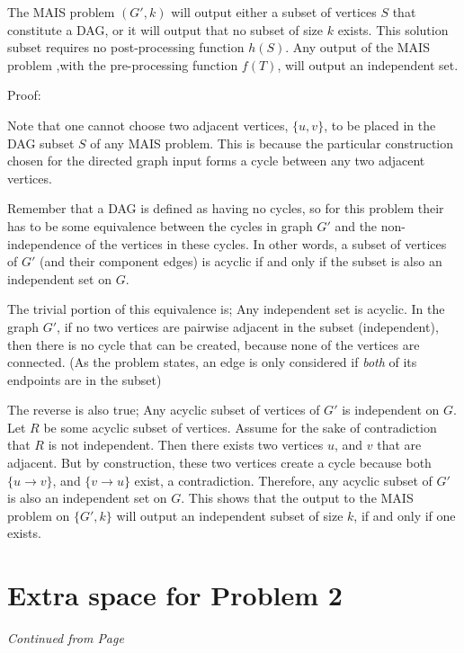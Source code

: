 \documentclass[11pt]{article}
\begin{document}
\label{pg:p1-continuation}

  The MAIS problem $(G',k)$ will output either a subset of vertices $S$ that constitute
  a DAG, or it will output that no subset of size $k$ exists. This solution subset
  requires no post-processing function $h(S)$. Any output of the MAIS problem 
  ,with the pre-processing function $f(T)$, will output an independent set. 
  
  Proof: 

  Note that one cannot choose two adjacent vertices, $\{u,v\}$,
  to be placed in the DAG subset $S$ of any MAIS problem. 
  This is because the particular
  construction chosen for the directed graph input forms a cycle between any two
  adjacent vertices. 

  Remember that a DAG is defined as having no cycles, so for this problem
  their has to be some equivalence between the cycles in graph $G'$ and 
  the non-independence of the vertices in these cycles. In other words, 
  a subset of vertices of $G'$ (and their component edges) is acyclic if and only if the subset
  is also an independent set on $G$. 
  
  The trivial portion of this equivalence is; Any independent set is acyclic. 
  In the graph $G'$, if no two vertices are pairwise adjacent in the subset (independent),
  then there is no cycle that can be created, because none of the vertices are connected. 
  (As the problem states, an edge is only considered if \emph{both} of its endpoints are in the subset)
  
  The reverse is also true; Any acyclic subset of vertices of $G'$ is independent on $G$.
  Let $R$ be some acyclic subset of vertices. Assume for the sake of contradiction that $R$ is not independent. 
  Then there exists two vertices $u$, and $v$ that are adjacent. But by construction, these two 
  vertices create a cycle because both  $\{u \rightarrow v\}$, and $\{v \rightarrow u\}$ exist, a contradiction.
  Therefore, any acyclic subset of $G'$ is also an independent set on $G$. This shows
  that the output to the MAIS problem on $\{G',k\}$ will output an independent subset of size $k$,
  if and only if one exists.
   
\newpage
 
\section*{Extra space for Problem 2}
\emph{Continued from Page \pageref{pg:end-of-p2}}
\end{document}
